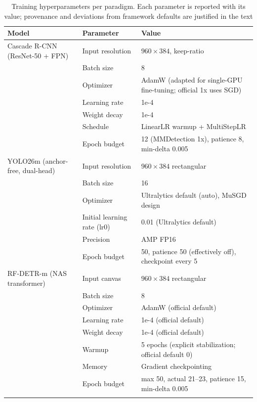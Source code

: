 \documentclass[pdflatex,sn-basic,Numbered,iicol]{sn-jnl}
\begin{document}
\begin{table}[t]
\caption{Training hyperparameters per paradigm. Each parameter is reported with its value; provenance and deviations from framework defaults are justified in the text}
\label{tab:tabla-hiperparametros}
\centering
\begin{tabular*}{\textwidth}{@{\extracolsep{\fill}}p{}p{}p{}@{}}
\toprule
Model & Parameter & Value \\
\midrule
Cascade R-CNN (ResNet-50 + FPN) & Input resolution & $960\times 384$, keep-ratio \\
& Batch size & 8 \\
& Optimizer & AdamW (adapted for single-GPU fine-tuning; official 1x uses SGD) \\
& Learning rate & 1e-4 \\
& Weight decay & 1e-4 \\
& Schedule & LinearLR warmup + MultiStepLR \\
& Epoch budget & 12 (MMDetection 1x), patience 8, min-delta 0.005 \\
\addlinespace
YOLO26m (anchor-free, dual-head) & Input resolution & $960\times 384$ rectangular \\
& Batch size & 16 \\
& Optimizer & Ultralytics default (auto), MuSGD design \\
& Initial learning rate (lr0) & 0.01 (Ultralytics default) \\
& Precision & AMP FP16 \\
& Epoch budget & 50, patience 50 (effectively off), checkpoint every 5 \\
\addlinespace
RF-DETR-m (NAS transformer) & Input canvas & $960\times 384$ rectangular \\
& Batch size & 8 \\
& Optimizer & AdamW (official default) \\
& Learning rate & 1e-4 (official default) \\
& Weight decay & 1e-4 (official default) \\
& Warmup & 5 epochs (explicit stabilization; official default 0) \\
& Memory & Gradient checkpointing \\
& Epoch budget & max 50, actual 21--23, patience 15, min-delta 0.005 \\
\botrule
\end{tabular*}
\end{table}
\end{document}
